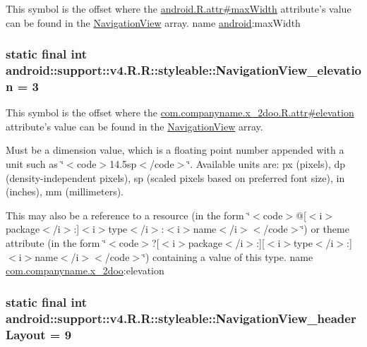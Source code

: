 This symbol is the offset where the \hyperlink{}{android.R.attr\#maxWidth} attribute's value can be found in the \hyperlink{classandroid_1_1support_1_1v4_1_1_r_1_1styleable_5278cd545a73a5a4af313995900ae2d8}{NavigationView} array.  name \hyperlink{namespaceandroid}{android}:maxWidth \hypertarget{classandroid_1_1support_1_1v4_1_1_r_1_1styleable_bb75dddc513645cd42bbfa399042cef3}{
\subsubsection[{NavigationView\_\-elevation}]{\setlength{\rightskip}{0pt plus 5cm}static final int android::support::v4.R.R::styleable::NavigationView\_\-elevation = 3}}
\label{classandroid_1_1support_1_1v4_1_1_r_1_1styleable_bb75dddc513645cd42bbfa399042cef3}


This symbol is the offset where the \hyperlink{classcom_1_1companyname_1_1x__2doo_1_1_r_1_1attr_3661b6445a2b19a2dca2157df91648d2}{com.companyname.x\_\-2doo.R.attr\#elevation} attribute's value can be found in the \hyperlink{classandroid_1_1support_1_1v4_1_1_r_1_1styleable_5278cd545a73a5a4af313995900ae2d8}{NavigationView} array.

Must be a dimension value, which is a floating point number appended with a unit such as \char`\"{}$<$code$>$14.5sp$<$/code$>$\char`\"{}. Available units are: px (pixels), dp (density-independent pixels), sp (scaled pixels based on preferred font size), in (inches), mm (millimeters). 

This may also be a reference to a resource (in the form \char`\"{}$<$code$>$@\mbox{[}$<$i$>$package$<$/i$>$:\mbox{]}$<$i$>$type$<$/i$>$:$<$i$>$name$<$/i$>$$<$/code$>$\char`\"{}) or theme attribute (in the form \char`\"{}$<$code$>$?\mbox{[}$<$i$>$package$<$/i$>$:\mbox{]}\mbox{[}$<$i$>$type$<$/i$>$:\mbox{]}$<$i$>$name$<$/i$>$$<$/code$>$\char`\"{}) containing a value of this type.  name \hyperlink{namespacecom_1_1companyname_1_1x__2doo}{com.companyname.x\_\-2doo}:elevation \hypertarget{classandroid_1_1support_1_1v4_1_1_r_1_1styleable_fe0580320d0eaac865d84f4737141ad0}{
\subsubsection[{NavigationView\_\-headerLayout}]{\setlength{\rightskip}{0pt plus 5cm}static final int android::support::v4.R.R::styleable::NavigationView\_\-headerLayout = 9}}
\label{classandroid_1_1support_1_1v4_1_1_r_1_1styleable_fe0580320d0eaac865d84f4737141ad0}


